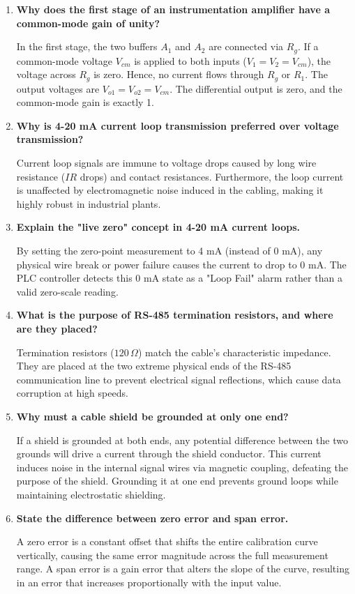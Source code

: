 \documentclass[12pt,a4paper]{article}
\newcommand{\Q}[1]{\textbf{#1}\par\noindent\ignorespaces}
\begin{document}
\begin{tcolorbox}[exambox, title={\textbf{Frequently Asked / Viva Questions}}]
\begin{enumerate}[leftmargin=*, itemsep=4pt]
  \item \Q{Why does the first stage of an instrumentation amplifier have a common-mode gain of unity?}
    In the first stage, the two buffers $A_1$ and $A_2$ are connected via $R_g$. If a common-mode voltage $V_{cm}$ is applied to both inputs ($V_1 = V_2 = V_{cm}$), the voltage across $R_g$ is zero. Hence, no current flows through $R_g$ or $R_1$. The output voltages are $V_{o1} = V_{o2} = V_{cm}$. The differential output is zero, and the common-mode gain is exactly 1.
  \item \Q{Why is 4-20 mA current loop transmission preferred over voltage transmission?}
    Current loop signals are immune to voltage drops caused by long wire resistance ($IR$ drops) and contact resistances. Furthermore, the loop current is unaffected by electromagnetic noise induced in the cabling, making it highly robust in industrial plants.
  \item \Q{Explain the "live zero" concept in 4-20 mA current loops.}
    By setting the zero-point measurement to 4 mA (instead of 0 mA), any physical wire break or power failure causes the current to drop to 0 mA. The PLC controller detects this 0 mA state as a "Loop Fail" alarm rather than a valid zero-scale reading.
  \item \Q{What is the purpose of RS-485 termination resistors, and where are they placed?}
    Termination resistors ($120\,\Omega$) match the cable's characteristic impedance. They are placed at the two extreme physical ends of the RS-485 communication line to prevent electrical signal reflections, which cause data corruption at high speeds.
  \item \Q{Why must a cable shield be grounded at only one end?}
    If a shield is grounded at both ends, any potential difference between the two grounds will drive a current through the shield conductor. This current induces noise in the internal signal wires via magnetic coupling, defeating the purpose of the shield. Grounding it at one end prevents ground loops while maintaining electrostatic shielding.
  \item \Q{State the difference between zero error and span error.}
    A zero error is a constant offset that shifts the entire calibration curve vertically, causing the same error magnitude across the full measurement range. A span error is a gain error that alters the slope of the curve, resulting in an error that increases proportionally with the input value.

\end{enumerate}
\end{tcolorbox}
\end{document}
